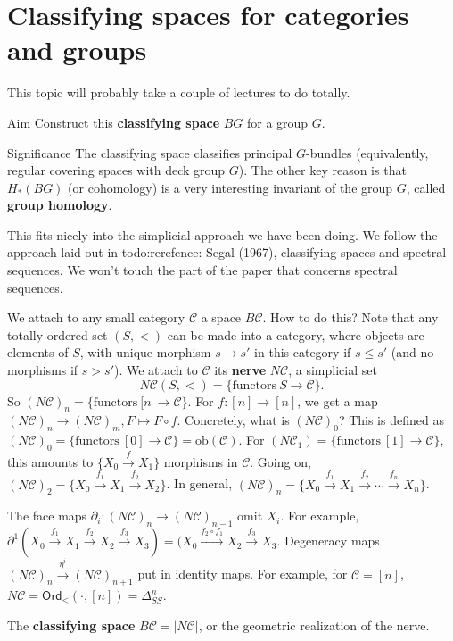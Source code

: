 \section{Classifying spaces for categories and groups} 
This topic will probably take a couple of lectures to do totally. 
\begin{namedthing}{Aim} 
   Construct this \textbf{classifying space} $BG$ for a group $G$. 
\end{namedthing}
\begin{namedthing}{Significance} 
    The classifying space classifies principal $G$-bundles (equivalently, regular covering spaces with deck group $G$). The other key reason is that $H_*(BG)$ (or cohomology) is a very interesting invariant of the group $G$, called \textbf{group homology}.
\end{namedthing}
This fits nicely into the simplicial approach we have been doing. We follow the approach laid out in {\color{red}todo:rerefence: Segal (1967), classifying spaces and spectral sequences.} We won't touch the part of the paper that concerns spectral sequences. 

We attach to any small category $\mathcal{C} $ a space $B\mathcal{C} $. How to do this? Note that any totally ordered set $(S,<)$ can be made into a category, where objects are elements of $S$, with unique morphism $s \to s'$ in this category if $s \leq s'$ (and no morphisms if $s>s'$). We attach to $\mathcal{C} $ its \textbf{nerve} $N\mathcal{C} $, a simplicial set \[
    N \mathcal{C} (S,<)= \{\text{functors} \ S \to \mathcal{C} \} .
\] So $(N\mathcal{C} )_n = \{ \text{functors} \ [n\ \to \mathcal{C} \} $. For $f \colon [n] \to [n]$, we get a map $(N\mathcal{C} )_n  \to (N\mathcal{C} )_m, F \mapsto F \circ f$. Concretely, what is $(N\mathcal{C} )_0$? This is defined as $(N\mathcal{C} )_0= \{ \text{functors} \ [0] \to \mathcal{C} \} =\mathrm{ob}(\mathcal{C} )$. For $(N\mathcal{C} _1)= \{ \text{functors} \ [1] \to \mathcal{C} \} $, this amounts to $\{ X_0\xrightarrow f X_1\} $ morphisms in $\mathcal{C} $. Going on, $(N\mathcal{C} )_2= \{X_0 \xrightarrow{f_1} X_1\xrightarrow{f_2} X_2\} $. In general, $(N\mathcal{C} )_n = \{X_0\xrightarrow{f_1} X_1\xrightarrow{f_2} \cdots \xrightarrow{f_n } X_n \} $.

The face maps $\partial _i  \colon (N\mathcal{C} ) _n \to (N\mathcal{C} )_{n-1}$ omit $X_i $. For example, $\partial ^1(X_0 \xrightarrow{f_1} X_1\xrightarrow{f_2} X_2\xrightarrow{f_3} X_3)=(X_0\xrightarrow{f_2 \circ f_1} X_2 \xrightarrow{f_3} X_3$. Degeneracy maps $(N\mathcal{C} )_n  \xrightarrow{\eta ^i } (N\mathcal{C} )_{n+1}$ put in identity maps. For example, for $\mathcal{C} =[n]$, $N\mathcal{C} =\mathsf{Ord} _{\leq} (\cdot ,[n])=\Delta ^n _{S S}$.
\begin{definition}[]
    The \textbf{classifying space} $B\mathcal{C} =| N\mathcal{C} |$, or the geometric realization of the nerve.
\end{definition}

